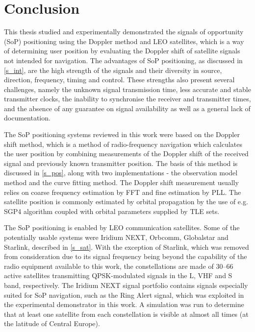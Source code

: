 \chapter{Conclusion}
\label{s_con}

This thesis studied and experimentally demonstrated the signals of opportunity (SoP) positioning using the Doppler method and LEO satellites, which is a way of determining user position by evaluating the Doppler shift of satellite signals not intended for navigation. The advantages of SoP positioning, as discussed in \autoref{s_int}, are the high strength of the signals and their diversity in source, direction, frequency, timing and control. These strengths also present several challenges, namely the unknown signal transmission time, less accurate and stable transmitter clocks, the inability to synchronise the receiver and transmitter times, and the absence of any guarantee on signal availability as well as a general lack of documentation.

The SoP positioning systems reviewed in this work were based on the Doppler shift method, which is a method of radio-frequency navigation which calculates the user position by combining measurements of the Doppler shift of the received signal and previously known transmitter position. The basis of this method is discussed in \autoref{s_pos}, along with two implementations - the observation model method and the curve fitting method. The Doppler shift measurement usually relies on coarse frequency estimation by FFT and fine estimation by PLL. The satellite position is commonly estimated by orbital propagation by the use of e.g. SGP4 algorithm coupled with orbital parameters supplied by TLE sets.

The SoP positioning is enabled by LEO communication satellites. Some of the potentially usable systems were Iridium NEXT, Orbcomm, Globalstar and Starlink, described in \autoref{s_sat}. With the exception of Starlink, which was removed from consideration due to its signal frequency being beyond the capability of the radio equipment available to this work, the constellations are made of \numrange{30}{66} active satellites transmitting QPSK-modulated signals in the L, VHF and S band, respectively. The Iridium NEXT signal portfolio contains signals especially suited for SoP navigation, such as the Ring Alert signal, which was exploited in the experimental demonstrator in this work. A simulation was run to determine that at least one satellite from each constellation is visible at almost all times (at the latitude of Central Europe).


